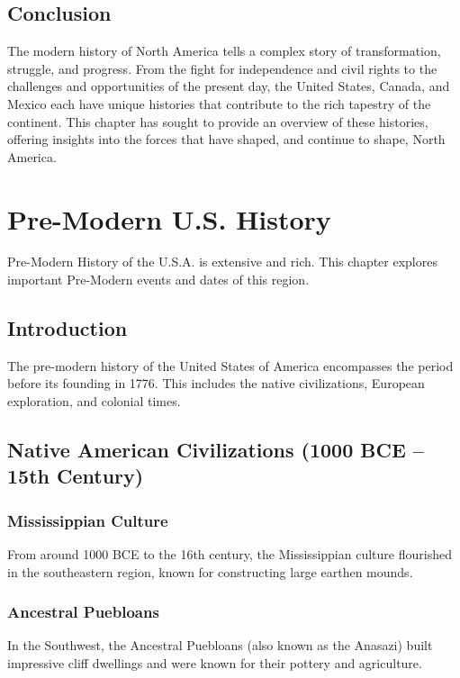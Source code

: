 \documentclass[a4paper,12pt]{book}
\begin{document}
\section{Conclusion}
\label{sec:conclusion-north-america-modern}
The modern history of North America tells a complex story of transformation, struggle, and progress. From the fight for independence and civil rights to the challenges and opportunities of the present day, the United States, Canada, and Mexico each have unique histories that contribute to the rich tapestry of the continent. This chapter has sought to provide an overview of these histories, offering insights into the forces that have shaped, and continue to shape, North America.

\chapter{Pre-Modern U.S. History}
\label{ch:pre-modern-us-history}

Pre-Modern History of the U.S.A. is extensive and rich. This chapter explores important Pre-Modern events and dates of this region.

\section{Introduction}
\label{sec:introduction-pre-modern-usa}
The pre-modern history of the United States of America encompasses the period before its founding in 1776. This includes the native civilizations, European exploration, and colonial times.

\section{Native American Civilizations (1000 BCE – 15th Century)}
\label{sec:native-american-civilizations}
\subsection{Mississippian Culture}
\label{subsec:mississippian-culture}
From around 1000 BCE to the 16th century, the Mississippian culture flourished in the southeastern region, known for constructing large earthen mounds.

\subsection{Ancestral Puebloans}
\label{subsec:ancestral-puebloans}
In the Southwest, the Ancestral Puebloans (also known as the Anasazi) built impressive cliff dwellings and were known for their pottery and agriculture.
\end{document}
